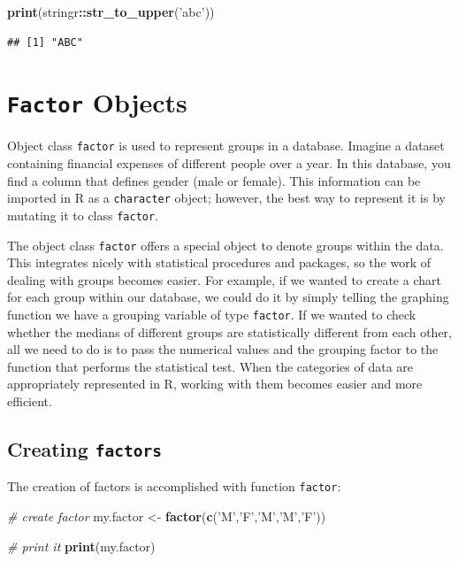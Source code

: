 \documentclass[11pt,]{book}
\newenvironment{Shaded}{\begin{snugshade}}{\end{snugshade}}
\newcommand{\KeywordTok}[1]{\textcolor[rgb]{0.27,0.27,0.27}{\textbf{#1}}}
\newcommand{\StringTok}[1]{\textcolor[rgb]{0.5,0.5,0.5}{#1}}
\newcommand{\CommentTok}[1]{\textcolor[rgb]{0.56,0.35,0.01}{\textit{#1}}}
\newcommand{\OperatorTok}[1]{\textcolor[rgb]{0.81,0.36,0.00}{\textbf{#1}}}
\newcommand{\NormalTok}[1]{#1}
\begin{document}
\begin{Shaded}
\begin{Highlighting}[]
\KeywordTok{print}\NormalTok{(stringr}\OperatorTok{::}\KeywordTok{str_to_upper}\NormalTok{(}\StringTok{'abc'}\NormalTok{))}
\end{Highlighting}
\end{Shaded}

\begin{verbatim}
## [1] "ABC"
\end{verbatim}

\section{\texorpdfstring{\texttt{Factor}
Objects}{Factor Objects}}\label{factor-objects}

Object class \texttt{factor} is used to represent groups in a database.
Imagine a dataset containing financial expenses of different people over
a year. In this database, you find a column that defines gender (male or
female). This information can be imported in R as a \texttt{character}
object; however, the best way to represent it is by mutating it to class
\texttt{factor}.

The object class \texttt{factor} offers a special object to denote
groups within the data. This integrates nicely with statistical
procedures and packages, so the work of dealing with groups becomes
easier. For example, if we wanted to create a chart for each group
within our database, we could do it by simply telling the graphing
function we have a grouping variable of type \texttt{factor}. If we
wanted to check whether the medians of different groups are
statistically different from each other, all we need to do is to pass
the numerical values and the grouping factor to the function that
performs the statistical test. When the categories of data are
appropriately represented in R, working with them becomes easier and
more efficient.

\subsection{\texorpdfstring{Creating
\texttt{factors}}{Creating factors}}\label{creating-factors}

The creation of factors is accomplished with function \texttt{factor}:

\begin{Shaded}
\begin{Highlighting}[]
\CommentTok{# create factor}
\NormalTok{my.factor <-}\StringTok{ }\KeywordTok{factor}\NormalTok{(}\KeywordTok{c}\NormalTok{(}\StringTok{'M'}\NormalTok{,}\StringTok{'F'}\NormalTok{,}\StringTok{'M'}\NormalTok{,}\StringTok{'M'}\NormalTok{,}\StringTok{'F'}\NormalTok{))}

\CommentTok{# print it}
\KeywordTok{print}\NormalTok{(my.factor)}
\end{Highlighting}
\end{Shaded}
\end{document}
